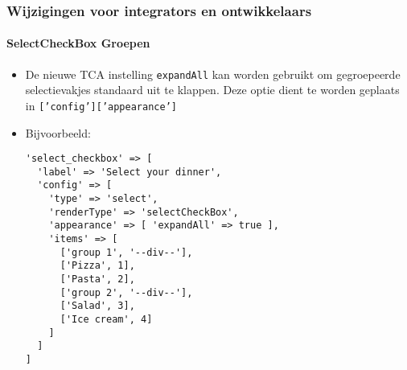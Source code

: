 %

\begin{frame}[fragile]
	\frametitle{Wijzigingen voor integrators en ontwikkelaars}
	\framesubtitle{SelectCheckBox Groepen}

	\lstset{basicstyle=\tiny\ttfamily}

	\begin{itemize}
		\item De nieuwe TCA instelling \texttt{expandAll} kan worden gebruikt om
		    gegroepeerde selectievakjes standaard uit te klappen. Deze optie dient
		    te worden geplaats in\newline
			\smaller\texttt{['config']['appearance']}\normalsize
		\item Bijvoorbeeld:
\begin{lstlisting}
'select_checkbox' => [
  'label' => 'Select your dinner',
  'config' => [
    'type' => 'select',
    'renderType' => 'selectCheckBox',
    'appearance' => [ 'expandAll' => true ],
    'items' => [
      ['group 1', '--div--'],
      ['Pizza', 1],
      ['Pasta', 2],
      ['group 2', '--div--'],
      ['Salad', 3],
      ['Ice cream', 4]
    ]
  ]
]
\end{lstlisting}

	\end{itemize}

\end{frame}

